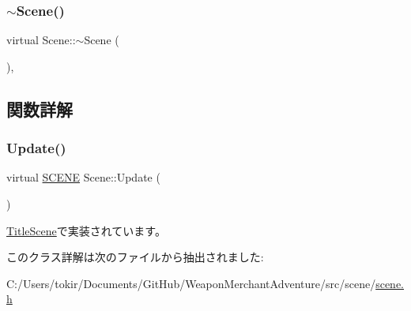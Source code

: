 \subsubsection{\texorpdfstring{$\sim$\+Scene()}{~Scene()}}
{\footnotesize\ttfamily virtual Scene\+::$\sim$\+Scene (\begin{DoxyParamCaption}{ }\end{DoxyParamCaption})\hspace{0.3cm}{\ttfamily [inline]}, {\ttfamily [virtual]}}



\subsection{関数詳解}
\mbox{\label{class_scene_acb50f8104e5a7cfecbdececa7d5f1b39}} 
\subsubsection{\texorpdfstring{Update()}{Update()}}
{\footnotesize\ttfamily virtual \mbox{\hyperlink{scene__base_8h_a24cee5343fb9d0706ead6e8601f363be}{S\+C\+E\+NE}} Scene\+::\+Update (\begin{DoxyParamCaption}{ }\end{DoxyParamCaption})\hspace{0.3cm}{\ttfamily [pure virtual]}}



\mbox{\hyperlink{class_title_scene_a19f6ee49ca6c8526fb1af2c0a2df9a33}{Title\+Scene}}で実装されています。



このクラス詳解は次のファイルから抽出されました\+:\begin{DoxyCompactItemize}
\item 
C\+:/\+Users/tokir/\+Documents/\+Git\+Hub/\+Weapon\+Merchant\+Adventure/src/scene/\mbox{\hyperlink{scene_8h}{scene.\+h}}\end{DoxyCompactItemize}
